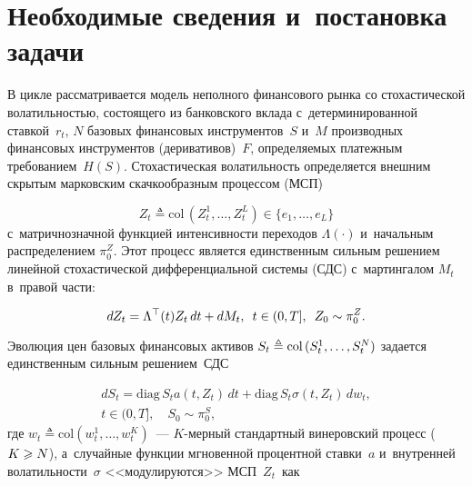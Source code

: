 
  
\vspace*{-4pt}



\thispagestyle{headings}

\begin{multicols}{2}

\label{st\stat}

\section{Необходимые сведения и~постановка задачи}

В цикле рассматривается модель неполного финансового рынка со сто\-ха\-сти\-че\-ской во\-ла\-тиль\-ностью, со\-сто\-яще\-го из банковского вкла\-да 
с~детерминированной став\-кой~$r_t$,  $N$ базовых финансовых инструментов~$S$ и~$M$ производных \mbox{финансовых} инструментов (деривативов)~$F$, 
опре\-де\-ля\-емых платежным требованием~$H(S)$. Сто\-ха\-сти\-че\-ская во\-ла\-тиль\-ность определяется внеш\-ним скрытым марковским скачкообразным процессом (МСП) 

\noindent
$$
Z_t \triangleq \mathrm{col}\,(Z_t^1, \ldots, Z_t^L) \in \{e_1,\ldots, e_L\}
$$ 
с~мат\-рич\-но\-знач\-ной функцией
 ин\-тен\-сив\-ности переходов $\Lambda(\cdot)$ и~начальным распределением $\pi_0^Z$.
Этот процесс является единственным сильным решением линейной сто\-ха\-сти\-че\-ской дифференциальной сис\-те\-мы (СДС) с~мартингалом $M_t$ в~правой \mbox{части}:

\noindent
\begin{equation}
  dZ_t = \Lambda^{\top}(t)Z_t\,dt + dM_t,\enskip t \in (0,T], \enskip Z_0 \sim \pi_0^Z.
  \label{eq:Z_sys}
  \end{equation}

Эволюция цен базовых финансовых активов $S_t \hm\triangleq \mathrm{col}\,(S_t^1,\ldots,S_t^N)$  задается единственным силь\-ным
решением~СДС

\columnbreak

\noindent
  \begin{multline}
  dS_t = \mathrm{diag}\, S_t a(t,Z_t)\,dt + \mathrm{diag}\,S_t \sigma(t,Z_t)\,dw_t,\\
  t \in (0,T], \quad S_0 \sim \pi_0^{S},
  \label{eq:S_sys_P}
  \end{multline}
  где $w_t \triangleq \mathrm{col}\left (w_t^1,\ldots,w_t^K\right)$~--- $K$-мер\-ный стандартный винеровский процесс ($K \hm\geqslant N$), 
  а~случайные функции мгновенной процентной став\-ки~$a$ и~внут\-рен\-ней во\-ла\-тиль\-ности~$\sigma$ <<модулируются>> МСП~$Z_t$~как
  

\end{multicols}
